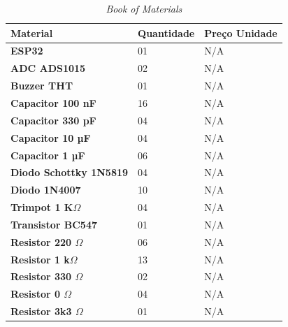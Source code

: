 \begin{table}[!ht]
    \centering
    \caption{\textit{Book of Materials}}
    \label{tab:Bookofmaterials}
    \begin{tabular}{|l|l|l|}
        \hline
        \textbf{Material}                      & \textbf{Quantidade} & \textbf{Preço Unidade} \\ \hline
        \textbf{ESP32}                         & 01                  & N/A                    \\ \hline
        \textbf{ADC ADS1015}                   & 02                  & N/A                    \\ \hline
        \textbf{Buzzer THT}                    & 01                  & N/A                    \\ \hline
        \textbf{Capacitor 100 nF}              & 16                  & N/A                    \\ \hline
        \textbf{Capacitor 330 pF}              & 04                  & N/A                    \\ \hline
        \textbf{Capacitor 10 µF}               & 04                  & N/A                    \\ \hline
        \textbf{Capacitor 1 µF}                & 06                  & N/A                    \\ \hline
        \textbf{Diodo Schottky 1N5819}         & 04                  & N/A                    \\ \hline
        \textbf{Diodo 1N4007}                  & 10                  & N/A                    \\ \hline
        \textbf{Trimpot 1 K$\Omega$}           & 04                  & N/A                    \\ \hline
        \textbf{Transistor BC547}              & 01                  & N/A                    \\ \hline
        \textbf{Resistor 220 $\Omega$}         & 06                  & N/A                    \\ \hline
        \textbf{Resistor 1 k$\Omega$}          & 13                  & N/A                    \\ \hline
        \textbf{Resistor 330 $\Omega$}         & 02                  & N/A                    \\ \hline
        \textbf{Resistor 0 $\Omega$}           & 04                  & N/A                    \\ \hline
        \textbf{Resistor 3k3 $\Omega$}         & 01                  & N/A                    \\ \hline

\end{tabular}
\end{table}
